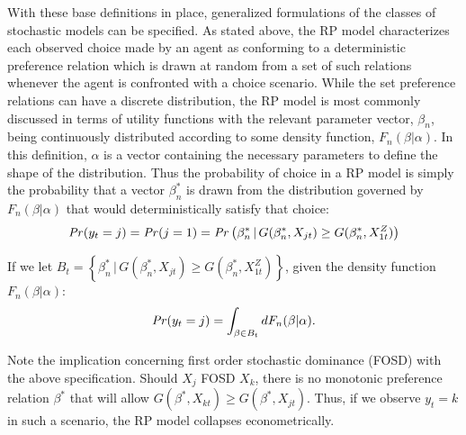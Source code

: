 \documentclass[../main.tex]{subfiles}
\begin{document}
With these base definitions in place, generalized formulations of the classes of stochastic models can be specified.
As stated above, the RP model characterizes each observed choice made by an agent as conforming to a deterministic preference relation which is drawn at random from a set of such relations whenever the agent is confronted with a choice scenario.
While the set preference relations can have a discrete distribution, the RP model is most commonly discussed in terms of utility functions with the relevant parameter vector, $\beta_n$, being continuously distributed according to some density function, $F_n(\beta | \alpha)$.
In this definition, $\alpha$ is a vector containing the necessary parameters to define the shape of the distribution.
Thus the probability of choice in a RP model is simply the probability that a vector $\beta_n^*$ is drawn from the distribution governed by $F_n(\beta | \alpha)$ that would deterministically satisfy that choice:
\begin{equation}
	\label{eq2:RP0}
	{\ensuremath{\mathit{Pr}}}(y_t=j) = {\mathit{Pr}}(j=1) = {\mathit{Pr}}\left( \beta_n^* \,|\, G(\beta_n^*,X_{jt}) \geq G(\beta_n^*,X_{1t}^Z)\right)
\end{equation}

\noindent If we let $ B_t = \left\{ \beta_n^* \,|\, G(\beta_n^*,X_{jt}) \geq G(\beta_n^*,X_{1t}^Z)\right\}$, given the density function $F_n(\beta | \alpha)$:
\begin{equation}
	\label{eq2:RP.f}
	{\ensuremath{\mathit{Pr}}}(y_t=j) = \int_{\beta \in B_t} dF_n(\beta|\alpha).
\end{equation}

Note the implication concerning first order stochastic dominance (FOSD){\footnotemark} with the above specification. Should $X_j$ FOSD $X_k$, there is no monotonic preference relation $\beta^*$ that will allow $G(\beta^*,X_{kt}) \geq G(\beta^*,X_{jt})$.
Thus, if we observe $y_t = k$ in such a scenario, the RP model collapses econometrically.

\addtocounter{footnote}{-1}
\end{document}
